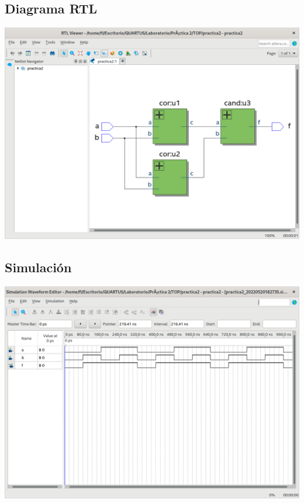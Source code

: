 \documentclass[10pt,a4paper]{article}
\begin{document}
	\subsection{Diagrama RTL}
	\begin{center}
		\includegraphics[scale=0.35]{RTL.png}
	\end{center}
	
	\subsection{Simulación}
	\begin{center}
		\includegraphics[scale=0.35]{Simulacion.png}
	\end{center}
	
\end{document}

